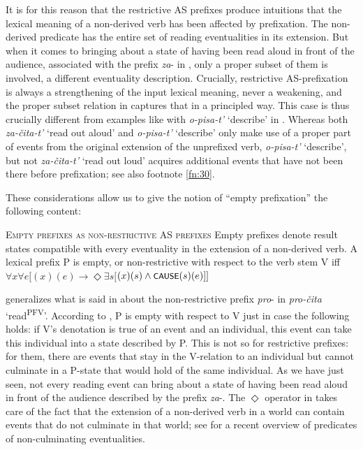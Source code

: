 \documentclass[output=paper,colorlinks,citecolor=brown]{langscibook}
\begin{document}
It is for this reason that the restrictive AS prefixes produce intuitions that the lexical meaning of a non-derived verb has been affected by prefixation. The non-derived predicate has the entire set of reading eventualities in its extension. But when it comes to bringing about a state of having been read aloud in front of the audience, associated with the prefix \textit{za}- in , only a proper subset of them is involved, a different eventuality description. Crucially, restrictive AS-prefixation is always a strengthening of the input lexical meaning, never a weakening, and the proper subset relation in  captures that in a principled way. This case is thus crucially different from examples like  with \textit{o-pisa-t'} ‘describe’ in . Whereas both \textit{za-čita-t’} ‘read out aloud’ and \textit{o-pisa-t’} ‘describe’ only make use of a proper part of events from the original extension of the unprefixed verb, \textit{o-pisa-t’} ‘describe’, but not \textit{za-čita-t’} ‘read out loud’ acquires additional events that have not been there before prefixation; see also footnote \ref{fn:30}.

These considerations allow us to give the notion of “empty prefixation” the following content:

\eanoraggedright   \textsc{Empty prefixes as non-restrictive AS prefixes}\label{ex:tatevosov:102}
\eanoraggedright Empty prefixes denote result states compatible with every eventuality in the extension of a non-derived verb.\label{ex:tatevosov:102a}
\ex A lexical prefix P is empty, or non-restrictive with respect to the verb stem V iff $\forall x\forall e [$$(x)(e) \rightarrow \Diamond \exists s[$$(x)(s) \wedge \cnst{cause}(s)(e)]]$\label{ex:tatevosov:102b}
\z
\z

\noindent {} generalizes what is said in  about the non-restrictive prefix \textit{pro}- in \textit{pro-čita} ‘read\textsuperscript{PFV}’. According to , P is empty with respect to V just in case the following holds: if V’s denotation is true of an event and an individual, this event can take this individual into a state described by P. This is not so for restrictive prefixes: for them, there are events that stay in the V-relation to an individual but cannot culminate in a P-state that would hold of the same individual. As we have just seen, not every reading event can bring about a state of having been read aloud in front of the audience described by the prefix \textit{za}-.  The $\Diamond$ operator in  takes care of the fact that the extension of a non-derived verb in a world can contain events that do not culminate in that world; see \citet{Martin.Demirdache2020} for a recent overview of predicates of non-culminating eventualities.
\end{document}
